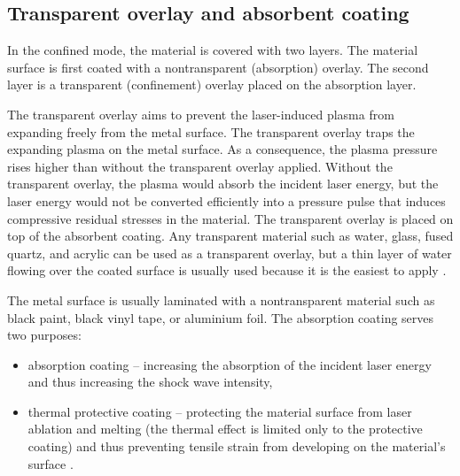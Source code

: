 \subsection{Transparent overlay and absorbent coating}

In the confined mode, the material is covered with two layers. The material surface is first coated with a nontransparent (absorption) overlay. The second layer is a transparent (confinement) overlay placed on the absorption layer.

The transparent overlay aims to prevent the laser-induced plasma from expanding freely from the metal surface.  The transparent overlay traps the expanding plasma on the metal surface. As a consequence, the plasma pressure rises higher than without the transparent overlay applied. Without the transparent overlay, the plasma would absorb the incident laser energy, but the laser energy would not be converted efficiently into a pressure pulse that induces compressive residual stresses in the material. The transparent overlay is placed on top of the absorbent coating. Any transparent material such as water, glass, fused quartz, and acrylic can be used as a transparent overlay, but a thin layer of water flowing over the coated surface is usually used because it is the easiest to apply \cite{clauer_lahrman_2001}.

The metal surface is usually laminated with a nontransparent material such as black paint, black vinyl tape, or aluminium foil. The absorption coating serves two purposes:

\begin{itemize}
    \item absorption coating -- increasing the absorption of the incident laser energy and thus increasing the shock wave intensity,
    \item thermal protective coating -- protecting the material surface from laser ablation and melting (the thermal effect is limited only to the protective coating) and thus preventing tensile strain from developing on the material's surface \cite{hong_wang_guo_wu_wang_dai_xia_xie_1998}.
\end{itemize}

